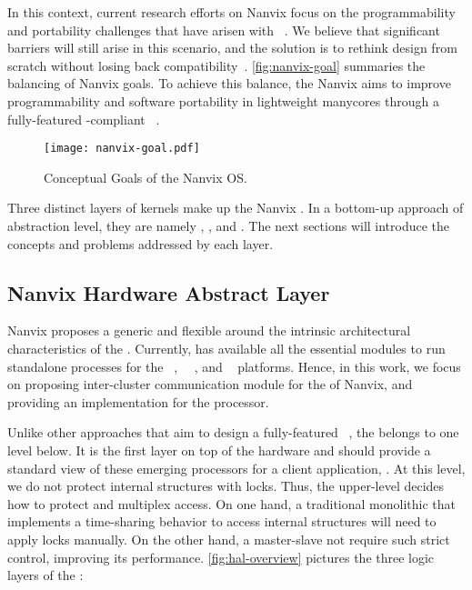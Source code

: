 	In this context, current research efforts on Nanvix \os focus on the
	programmability and portability	challenges that have arisen with
	\lightweight \manycores~\cite{christgau2017, gamell2012, serres2011}.
	We believe that significant barriers will still arise in this scenario, and
	the solution is to rethink \os design from scratch without losing back
	compatibility~\cite{penna:compas19, penna2019}.
	\autoref{fig:nanvix-goal} summaries the balancing of Nanvix \os goals.
	To achieve this balance, the Nanvix \os aims to improve programmability
	and software portability in lightweight manycores through a fully-featured
	\posix-compliant \os~\cite{penna:compas19}.

	\begin{figure}[!tb]
		\centering%
		\caption{Conceptual Goals of the Nanvix OS.}%
		\label{fig:nanvix-goal}%
		\texttt{[image: nanvix-goal.pdf]}%
	\end{figure}

	Three distinct layers of kernels make up the Nanvix \os.
	In a bottom-up approach of abstraction level, they are namely \nanvix \hal,
	\nanvix \microkernel, and \nanvix \multikernel.
	The next sections will introduce the concepts and problems addressed by
	each layer.

	\subsection{Nanvix Hardware Abstract Layer}
	\label{sec.hal}

		Nanvix \os proposes a generic and flexible \hal around the
		intrinsic architectural characteristics of the \lightweight \manycores.
		Currently, \hal has available all the essential modules to run standalone
		processes for the \mppa~\cite{DeDinechin2013-1}, \optimsoc~~\cite{Wallentowitz2013},
		and \hero~\cite{Kurth2017} platforms.
		Hence, in this work, we focus on proposing
		inter-cluster communication module for the \hal of Nanvix, and
		providing an implementation for the \mppa processor.

		Unlike other approaches that aim to design a fully-featured \os~\cite{Baumann2009,kluge2014,nightingale2009,rhoden2011},
		the \hal belongs to one level below.
		It is the first layer on top of the hardware and should provide a standard
		view of these emerging processors for a client application, \eg \os.
		At this level, we do not protect internal structures with locks.
		Thus, the upper-level decides how to protect and multiplex \hal access.
		On one hand, a traditional monolithic \os that implements a time-sharing
		behavior to access internal structures will need to apply locks manually.
		On the other hand, a master-slave \os not require such strict control,
		improving its performance.
		\autoref{fig:hal-overview} pictures the three logic layers of the \hal:

